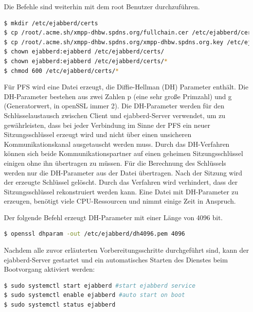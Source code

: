 \documentclass[a4paper,titlepage,halfparskip,12pt]{scrreprt}
\begin{document}
\begin{onehalfspacing}
Die Befehle sind weiterhin mit dem root Benutzer durchzuführen.

\bigskip

\begin{lstlisting}[language=bash, caption={Kopieren der Zertifikate in ein Unterverzeichnis und Einschränkung der Rechte},label={lst:ejabberdCerts}]
$ mkdir /etc/ejabberd/certs
$ cp /root/.acme.sh/xmpp-dhbw.spdns.org/fullchain.cer /etc/ejabberd/certs/fullchain.pem
$ cp /root/.acme.sh/xmpp-dhbw.spdns.org/xmpp-dhbw.spdns.org.key /etc/ejabberd/certs/
$ chown ejabberd:ejabberd /etc/ejabberd/certs/
$ chown ejabberd:ejabberd /etc/ejabberd/certs/*
$ chmod 600 /etc/ejabberd/certs/*
\end{lstlisting}

Für \ac{PFS} wird eine Datei erzeugt, die Diffie-Hellman (DH) Parameter enthält. Die DH-Parameter bestehen aus zwei Zahlen p (eine sehr große Primzahl) und g (Generatorwert, in openSSL immer 2). Die DH-Parameter werden für den Schlüsselaustausch zwischen Client und ejabberd-Server verwendet, um zu gewährleisten, dass bei jeder Verbindung im Sinne der \ac{PFS} ein neuer Sitzungsschlüssel erzeugt wird und nicht über einen unsicheren Kommunikationskanal ausgetauscht werden muss. Durch das DH-Verfahren können sich beide Kommunikationspartner auf einen geheimen Sitzungsschlüssel einigen ohne ihn übertragen zu müssen. Für die Berechnung des Schlüssels werden nur die DH-Parameter aus der Datei übertragen. Nach der Sitzung wird der erzeugte Schlüssel gelöscht. Durch das Verfahren wird verhindert, dass der Sitzungsschlüssel rekonstruiert werden kann. Eine Datei mit DH-Parameter zu erzeugen, benötigt viele CPU-Ressourcen und nimmt einige Zeit in Anspruch.\cite{perfectForwardSecrecy}

Der folgende Befehl erzeugt DH-Parameter mit einer Länge von 4096 bit.

\bigskip

\begin{lstlisting}[language=bash, caption={Erzeugen von Diffie-Hellman-Parametern für den ejabberd-Server},label={lst:DHParameters}]
$ openssl dhparam -out /etc/ejabberd/dh4096.pem 4096
\end{lstlisting}

Nachdem alle zuvor erläuterten Vorbereitungsschritte durchgeführt sind, kann der ejabberd-Server gestartet und ein automatisches Starten des Dienstes beim Bootvorgang aktiviert werden:

\bigskip

\begin{lstlisting}[language=bash, caption={Starten der ejabberd-Instanz}]
$ sudo systemctl start ejabberd #start ejabberd service
$ sudo systemctl enable ejabberd #auto start on boot
$ sudo systemctl status ejabberd
\end{lstlisting}


\end{onehalfspacing}
\end{document}
